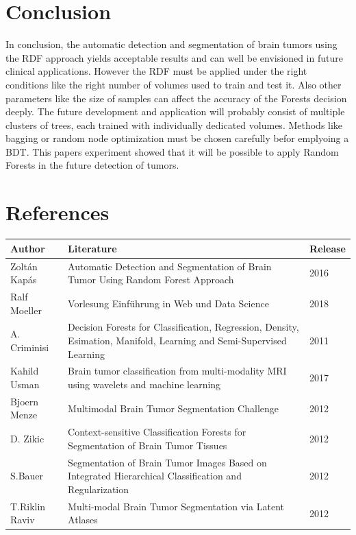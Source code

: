 \documentclass[
12pt,
headsepline,
bibliography=totoc,
twoside=semi,
fleqn
]{scrartcl}
\begin{document}
\section{Conclusion\label{sec:sec5}}

  In conclusion, the automatic detection and segmentation of brain tumors using the RDF approach yields acceptable results and can well be envisioned in future clinical applications. However the RDF must be applied under the right conditions like the right number of volumes used to train and test it. Also other parameters like the size of samples can affect the accuracy of the Forests decision deeply. The future development and application will probably consist of multiple clusters of trees, each trained with individually dedicated volumes. Methods like bagging or random node optimization must be chosen carefully befor emplyoing a BDT. This papers experiment showed that it will be possible to apply Random Forests in the future detection of tumors. 

\newpage
\section{References\label{sec.sec5}}




\begin{table}[H]
 \footnotesize
 \vspace{1ex}
 \centering 
 \begin{tabular}{p{2.5cm}p{8.7cm}p{2.8cm}}
 \toprule
 \textbf{Author} & \textbf{Literature} & \textbf{Release} \\
 \midrule
 Zoltán Kapás & Automatic Detection and Segmentation of Brain Tumor Using Random Forest Approach & 2016 \\
 Ralf Moeller & Vorlesung Einführung in Web und Data Science & 2018 \\
 A. Criminisi & Decision Forests for Classification, Regression, Density, Esimation, Manifold, Learning and Semi-Supervised Learning & 2011 \\
 Kahild Usman & Brain tumor classification from multi-modality MRI using wavelets and machine learning & 2017 \\
 Bjoern Menze&Multimodal Brain Tumor Segmentation Challenge&2012\\
 D. Zikic&Context-sensitive Classification Forests for Segmentation of Brain Tumor Tissues&2012\\
 S.Bauer&Segmentation of Brain Tumor Images Based on Integrated Hierarchical Classification and Regularization&2012\\
 T.Riklin Raviv&Multi-modal Brain Tumor Segmentation via Latent Atlases&2012


 \end{tabular}
 \vspace{2ex}
\end{table}


%
%
\end{document}
